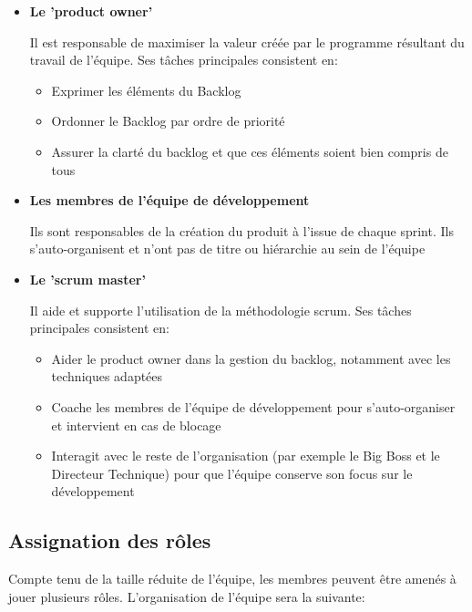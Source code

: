 \begin{itemize}
      \item \textbf{Le 'product owner'}
      
      Il est responsable de maximiser la valeur créée par le programme résultant du travail de l'équipe. 
      Ses tâches principales consistent en:
      \begin{itemize}
            \item Exprimer les éléments du Backlog
            \item Ordonner le Backlog par ordre de priorité
            \item Assurer la clarté du backlog et que ces éléments soient bien compris de tous
      \end{itemize}

      \item \textbf{Les membres de l'équipe de développement}
      
      Ils sont responsables de la création du produit à l'issue de chaque sprint. 
      Ils s’auto-organisent et n’ont pas de titre ou hiérarchie au sein de l'équipe

      \item \textbf{Le 'scrum master'}
      
      Il aide et supporte l'utilisation de la méthodologie scrum. Ses tâches principales consistent en:
      \begin{itemize}
            \item Aider le product owner dans la gestion du backlog, notamment avec les techniques adaptées
            \item Coache les membres de l'équipe de développement pour s’auto-organiser et intervient en cas de blocage
            \item Interagit avec le reste de l’organisation (par exemple le Big Boss et le Directeur Technique) pour que 
            l'équipe conserve son focus sur le développement
      \end{itemize}

\end{itemize}

\subsection{Assignation des rôles}

Compte tenu de la taille réduite de l'équipe, les membres peuvent être amenés à jouer plusieurs rôles. 
L’organisation de l'équipe sera la suivante:\\


